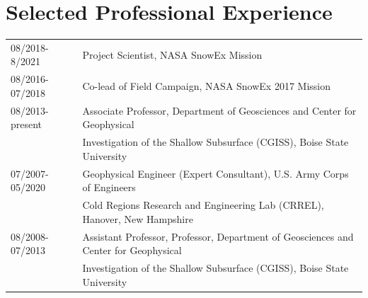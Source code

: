 \documentclass[11pt]{article}
\begin{document}
\section*{Selected Professional Experience}
\begin{tabular}{ll}
08/2018-8/2021 & Project Scientist, NASA SnowEx Mission  \\
08/2016-07/2018 & Co-lead of Field Campaign, NASA SnowEx 2017 Mission \\
08/2013-present & Associate Professor, Department of Geosciences and Center for Geophysical \\
&   Investigation of the Shallow Subsurface (CGISS), Boise State University \\
07/2007-05/2020 & Geophysical Engineer (Expert Consultant), U.S. Army Corps of Engineers \\
& Cold Regions Research and Engineering Lab (CRREL), Hanover, New Hampshire \\
08/2008-07/2013 & Assistant Professor, Professor, Department of Geosciences and Center for Geophysical \\
&   Investigation of the Shallow Subsurface (CGISS), Boise State University \\
\end{tabular}
\end{document}
